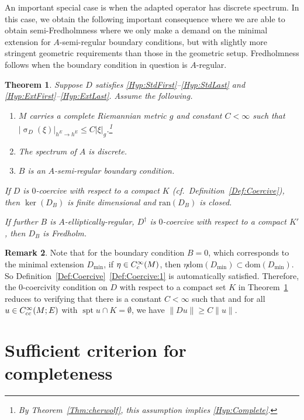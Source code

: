 \documentclass[a4paper,10pt,reqno]{amsart}
\newcommand{\sym}{\upsigma}
\newcommand{\modulus}[1]{|#1|}
\newcommand{\norm}[1]{\| #1 \|}%
\newcommand{\Ck}[2][{}]{{\rm C}^{#2}_{\rm #1}}%
\newcommand{\ran}{\mathrm{ran}}
\newcommand{\dom}{\mathrm{dom}}
\DeclareMathOperator{\spt}{spt}%
\newtheorem{theorem}{Theorem}[section]
\theoremstyle{definition}
\newtheorem{remark}[theorem]{Remark}
\begin{document}
An important special case is when the adapted operator has discrete spectrum.
In this case, we obtain the following important consequence where we are able to obtain semi-Fredholmness where we only make a demand on the minimal extension for $A$-semi-regular boundary conditions, but with slightly more stringent geometric requirements than those in the geometric setup. 
Fredholmness follows when the boundary condition in question is $A$-regular.

\begin{theorem}
\label{Thm:Freddy:Discrete}
Suppose $D$ satisfies \ref{Hyp:StdFirst}--\ref{Hyp:StdLast} and \ref{Hyp:ExtFirst}--\ref{Hyp:ExtLast}. 
Assume the following.
  \begin{enumerate}[label=(\roman*), labelwidth=0pt, labelindent=2pt, leftmargin=21pt]
\item \label{Itm:Freddy:Discrete1} 
$M$ carries a complete Riemannian metric $g$  and constant $C < \infty$ such that $\modulus{ \sym_{D}(\xi)}_{h^E \to h^E} \leq C \modulus{\xi}_{g}$.\footnote{By Theorem~\ref{Thm:cherwolf}, this assumption implies \ref{Hyp:Complete}.}
\item \label{Itm:Freddy:Discrete3} 
The spectrum of $A$ is discrete.
\item \label{Itm:Freddy:Discrete4} 
$B$ is an $A$-semi-regular boundary condition. 
\end{enumerate} 
If $D$ is $0$-coercive with respect to a compact $K$ (cf.\ Definition~\ref{Def:Coercive}), then $\ker(D_B)$ is finite dimensional and $\ran(D_B)$ is closed.

If further $B$ is $A$-elliptically-regular, $D^\dagger$ is $0$-coercive with respect to a compact $K'$, then $D_B$ is Fredholm.
\end{theorem}


\begin{remark}
Note that for the boundary condition $B = 0$, which corresponds to the minimal extension $D_{\min}$, if $\eta \in \Ck[c]{\infty}(M)$, then $\eta \dom(D_{\min}) \subset \dom(D_{\min})$.
So Definition~\ref{Def:Coercive}~\ref{Def:Coercive:1} is automatically satisfied. 
Therefore, the $0$-coercivity condition on $D$ with respect to a compact set $K$ in Theorem~\ref{Thm:Freddy:Discrete} reduces to verifying that there is a constant $C < \infty$ such that and for all $u \in \Ck[cc]{\infty}(M;E)$ with $\spt u \cap K = \emptyset$, we have $\norm{Du} \geq C \norm{u}$. 
\end{remark}


\section{Sufficient criterion for completeness}
\end{document}
